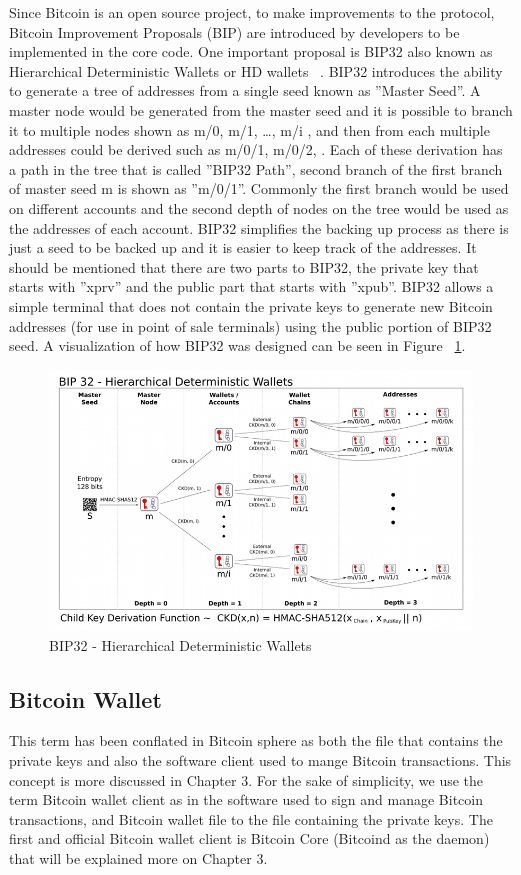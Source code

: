 Since Bitcoin is an open source project, to make improvements to the protocol, Bitcoin Improvement Proposals (BIP) are introduced by developers to be implemented in the core code. One important proposal is BIP32 also known as Hierarchical Deterministic Wallets or HD wallets ~\cite{bip32}. BIP32 introduces the ability to generate a tree of addresses from a single seed known as ''Master Seed''. A master node would be generated from the master seed and it is possible to branch it to multiple nodes shown as m/0, m/1, \dots, m/i , and then from each multiple addresses could be derived such as m/0/1, m/0/2, \etc. Each of these derivation has a path in the tree that is called ''BIP32 Path'', \eg second branch of the first branch of master seed m is shown as ''m/0/1''. Commonly the first branch would be used on different accounts and the second depth of nodes on the tree would be used as the addresses of each account. BIP32 simplifies the backing up process as there is just a seed to be backed up and it is easier to keep track of the addresses. It should be mentioned that there are two parts to BIP32, the private key that starts with ''xprv'' and the public part that starts with ''xpub''. BIP32 allows a simple terminal that does not contain the private keys to generate new Bitcoin addresses (for use in point of sale terminals) using the public portion of BIP32 seed. A visualization of how BIP32 was designed can be seen in Figure ~\ref{fig:bip32}.

\begin{figure}
\centering
\includegraphics[width=\linewidth]{fig/bip32derivation.png}
  \caption{BIP32 - Hierarchical Deterministic Wallets ~\cite{bip32proposal}}
\label{fig:bip32}
\end{figure}


\subsection{Bitcoin Wallet}
This term has been conflated in Bitcoin sphere as both the file that contains the private keys and also the software client used to mange Bitcoin transactions. This concept is more discussed in Chapter 3. For the sake of simplicity, we use the term Bitcoin wallet client as in the software used to sign and manage Bitcoin transactions, and Bitcoin wallet file to the file containing the private keys.
The first and official Bitcoin wallet client is Bitcoin Core (Bitcoind as the daemon) that will be explained more on Chapter 3.


